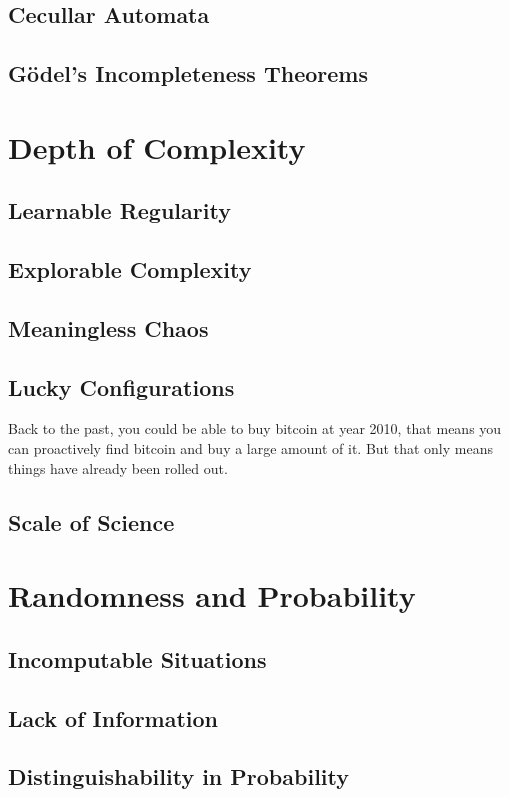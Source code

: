 \subsection{Cecullar Automata}
\subsection{Gödel's Incompleteness Theorems}

\section{Depth of Complexity}
\subsection{Learnable Regularity}
\subsection{Explorable Complexity}
\subsection{Meaningless Chaos}
\subsection{Lucky Configurations}

Back to the past, you could be able to buy bitcoin at year 2010, that means you can proactively find bitcoin and buy a large amount of it. But that only means things have already been rolled out.

\subsection{Scale of Science}

\section{Randomness and Probability}
\subsection{Incomputable Situations}
\subsection{Lack of Information}
\subsection{Distinguishability in Probability}
